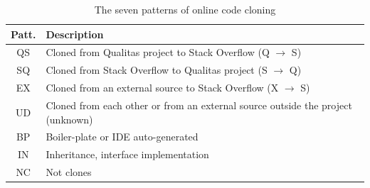 \documentclass[10pt,journal,compsoc]{IEEEtran}
\begin{document}
\begin{table}
	\centering
	\caption{The seven patterns of online code cloning}
	\label{tab:classification_scheme}
	\begin{tabular}{c@{~~}p{7.35cm}}
		\toprule
		Patt. & Description \\ 
		\midrule
		QS & Cloned from Qualitas project to Stack Overflow (Q $\rightarrow$ S) \\ 
		
		SQ & Cloned from Stack Overflow to Qualitas project (S $\rightarrow$ Q) \\ 
		
		EX & Cloned from an external source to Stack Overflow (X $\rightarrow$ S) \\
		
		UD & Cloned from each other or from an external source
                     outside the project (unknown)\\
		\midrule
		BP & Boiler-plate or IDE auto-generated \\ 
		
		IN & Inheritance, interface implementation  \\ 
		
		NC & Not clones \\ 
		\bottomrule 
	\end{tabular}  %
\end{table}
\end{document}
